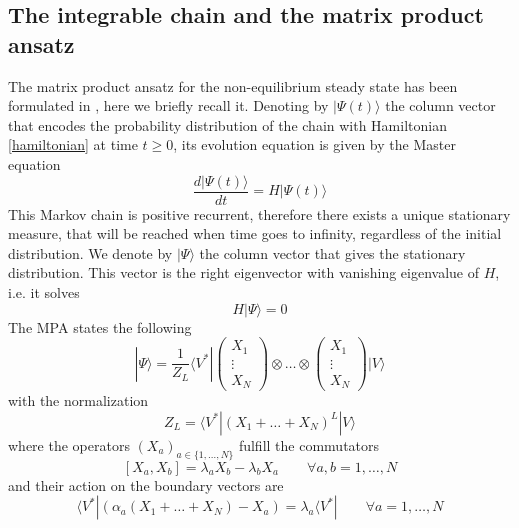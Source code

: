 \documentclass[10pt]{article}
\numberwithin{equation}{section}
\numberwithin{equation}{subsection}
\begin{document}
\subsection{The integrable chain and the matrix product ansatz}
The matrix product ansatz for the non-equilibrium steady state has been formulated in \cite{vanicat2017exact}, here we briefly recall it.
 Denoting by $|\Psi(t)\rangle$ the column vector that encodes the probability distribution of the chain with Hamiltonian \eqref{hamiltonian} at time $t\geq 0$, its evolution equation is given by 
 the Master equation
\begin{equation}
    \frac{d|{\Psi}(t)\rangle}{dt}=H|{\Psi}(t)\rangle
\end{equation}
This Markov chain is positive recurrent, therefore there exists a unique stationary measure, that will be reached when time goes to infinity, regardless of the initial distribution. 
We denote by $|\Psi\rangle$ the column vector that gives the stationary distribution. This vector is the right eigenvector with vanishing eigenvalue of $H$, i.e. it solves 
\begin{equation}\label{definition-SteadyStateH}
	H|\Psi\rangle =0
\end{equation}
The MPA states the following
\begin{equation}
	|\Psi\rangle=\frac{1}{Z_{L}}\langle V^{*}|\begin{pmatrix}
		X_{1}\\
		\vdots\\
		X_{N}
	\end{pmatrix}\otimes \ldots\otimes \begin{pmatrix}
		X_{1}\\
		\vdots\\
		X_{N}
	\end{pmatrix}|V\rangle
\end{equation}
with the normalization 
\begin{equation}
	Z_{L}=\langle V^{*}|(X_{1}+\ldots +X_{N})^{L}|V\rangle
\end{equation}
where the operators $(X_{a})_{a\in \{1,\ldots,N\}}$ fulfill the commutators
\begin{equation}\label{bulk}
	\left[X_{a},X_{b}\right]=\lambda_{a}X_{b}-\lambda_{b}X_{a}\qquad\forall a,b=1,\ldots,N
\end{equation}
and their action on the boundary vectors are
\begin{equation}\label{leftBoundary}
	\langle V^{*}|\left(\alpha_{a}(X_{1}+\ldots+X_{N})-X_{a}\right)=\lambda_{a}\langle V^{*}|\qquad\forall a=1,\ldots,N
\end{equation}
\end{document}
